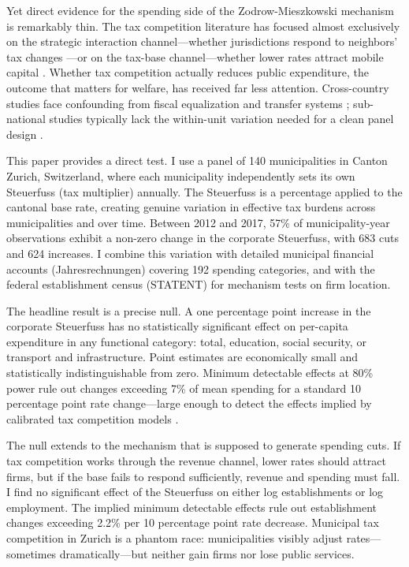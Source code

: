 \documentclass[12pt]{article}
\begin{document}
Yet direct evidence for the spending side of the Zodrow-Mieszkowski mechanism is remarkably thin. The tax competition literature has focused almost exclusively on the strategic interaction channel---whether jurisdictions respond to neighbors' tax changes \citep{brueckner2003strategic, eugster2019culture, parchet2019culture}---or on the tax-base channel---whether lower rates attract mobile capital \citep{devereux2007impact, krapf2025}. Whether tax competition actually reduces public expenditure, the outcome that matters for welfare, has received far less attention. Cross-country studies face confounding from fiscal equalization and transfer systems \citep{keen1998vertical}; sub-national studies typically lack the within-unit variation needed for a clean panel design \citep{revelli2005tax}.

This paper provides a direct test. I use a panel of 140 municipalities in Canton Zurich, Switzerland, where each municipality independently sets its own Steuerfuss (tax multiplier) annually. The Steuerfuss is a percentage applied to the cantonal base rate, creating genuine variation in effective tax burdens across municipalities and over time. Between 2012 and 2017, 57\% of municipality-year observations exhibit a non-zero change in the corporate Steuerfuss, with 683 cuts and 624 increases. I combine this variation with detailed municipal financial accounts (Jahresrechnungen) covering 192 spending categories, and with the federal establishment census (STATENT) for mechanism tests on firm location.

The headline result is a precise null. A one percentage point increase in the corporate Steuerfuss has no statistically significant effect on per-capita expenditure in any functional category: total, education, social security, or transport and infrastructure. Point estimates are economically small and statistically indistinguishable from zero. Minimum detectable effects at 80\% power rule out changes exceeding 7\% of mean spending for a standard 10 percentage point rate change---large enough to detect the effects implied by calibrated tax competition models \citep{zodrow2007property}.

The null extends to the mechanism that is supposed to generate spending cuts. If tax competition works through the revenue channel, lower rates should attract firms, but if the base fails to respond sufficiently, revenue and spending must fall. I find no significant effect of the Steuerfuss on either log establishments or log employment. The implied minimum detectable effects rule out establishment changes exceeding 2.2\% per 10 percentage point rate decrease. Municipal tax competition in Zurich is a phantom race: municipalities visibly adjust rates---sometimes dramatically---but neither gain firms nor lose public services.
\end{document}
